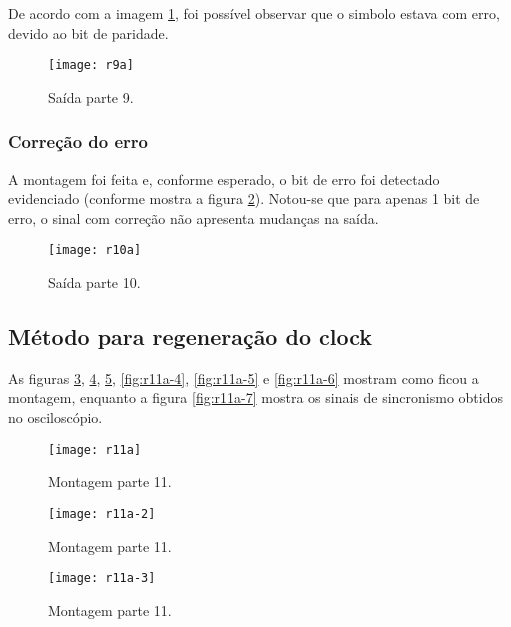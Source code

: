      De acordo com a imagem \ref{fig:r9a}, foi possível observar que o simbolo estava com erro, devido ao bit de paridade.
     
     
         \begin{figure}[H]
             \centering
             \caption{Saída parte 9.}
             \texttt{[image: r9a]}
             
             \label{fig:r9a}
            \end{figure}  
            
     \subsubsection{Correção do erro} 
     A montagem foi feita e, conforme esperado, o bit de erro foi detectado evidenciado (conforme mostra a figura \ref{fig:r10a}).
     Notou-se que para apenas 1 bit de erro, o sinal com correção não apresenta mudanças na saída.
     
     \begin{figure}[H]
         \centering
         \caption{Saída parte 10.}
         \texttt{[image: r10a]}
         
         \label{fig:r10a}
        \end{figure} 
        
    \subsection{Método para regeneração do clock}
    As figuras \ref{fig:r11a}, \ref{fig:r11a-2}, \ref{fig:r11a-3}, \ref{fig:r11a-4}, \ref{fig:r11a-5} e \ref{fig:r11a-6} mostram como ficou a montagem, enquanto a figura \ref{fig:r11a-7} mostra os sinais de sincronismo obtidos no osciloscópio. 
    
         \begin{figure}[H]
             \centering
             \caption{Montagem parte 11.}
             \texttt{[image: r11a]}
             
             \label{fig:r11a}
            \end{figure} 
           \begin{figure}[H]
               \centering
               \caption{Montagem parte 11.}
               \texttt{[image: r11a-2]}
               
               \label{fig:r11a-2}
            \end{figure} 
        \begin{figure}[H]
            \centering
            \caption{Montagem parte 11.}
            \texttt{[image: r11a-3]}
            
            \label{fig:r11a-3}
        \end{figure} 
        
